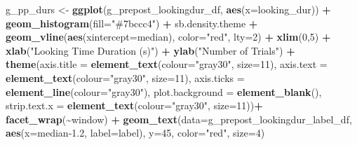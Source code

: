 \documentclass[
  doc,floatsintext]{apa6}
\newenvironment{Shaded}{\begin{snugshade}}{\end{snugshade}}
\newcommand{\AttributeTok}[1]{\textcolor[rgb]{0.13,0.29,0.53}{#1}}
\newcommand{\DecValTok}[1]{\textcolor[rgb]{0.00,0.00,0.81}{#1}}
\newcommand{\FloatTok}[1]{\textcolor[rgb]{0.00,0.00,0.81}{#1}}
\newcommand{\FunctionTok}[1]{\textcolor[rgb]{0.13,0.29,0.53}{\textbf{#1}}}
\newcommand{\NormalTok}[1]{#1}
\newcommand{\OtherTok}[1]{\textcolor[rgb]{0.56,0.35,0.01}{#1}}
\newcommand{\SpecialCharTok}[1]{\textcolor[rgb]{0.81,0.36,0.00}{\textbf{#1}}}
\newcommand{\StringTok}[1]{\textcolor[rgb]{0.31,0.60,0.02}{#1}}
\begin{document}
\begin{Shaded}
\begin{Highlighting}[]
\NormalTok{g\_pp\_durs }\OtherTok{\textless{}{-}} \FunctionTok{ggplot}\NormalTok{(g\_prepost\_lookingdur\_df, }\FunctionTok{aes}\NormalTok{(}\AttributeTok{x=}\NormalTok{looking\_dur)) }\SpecialCharTok{+}
  \FunctionTok{geom\_histogram}\NormalTok{(}\AttributeTok{fill=}\StringTok{"\#7bccc4"}\NormalTok{) }\SpecialCharTok{+}
\NormalTok{  sb.density.theme }\SpecialCharTok{+}
  \FunctionTok{geom\_vline}\NormalTok{(}\FunctionTok{aes}\NormalTok{(}\AttributeTok{xintercept=}\NormalTok{median), }\AttributeTok{color=}\StringTok{"red"}\NormalTok{, }\AttributeTok{lty=}\DecValTok{2}\NormalTok{) }\SpecialCharTok{+}
  \FunctionTok{xlim}\NormalTok{(}\DecValTok{0}\NormalTok{,}\DecValTok{5}\NormalTok{) }\SpecialCharTok{+}
  \FunctionTok{xlab}\NormalTok{(}\StringTok{"Looking Time Duration (s)"}\NormalTok{) }\SpecialCharTok{+}
  \FunctionTok{ylab}\NormalTok{(}\StringTok{"Number of Trials"}\NormalTok{) }\SpecialCharTok{+} 
  \FunctionTok{theme}\NormalTok{(}\AttributeTok{axis.title =} \FunctionTok{element\_text}\NormalTok{(}\AttributeTok{colour=}\StringTok{"gray30"}\NormalTok{, }\AttributeTok{size=}\DecValTok{11}\NormalTok{),}
        \AttributeTok{axis.text =} \FunctionTok{element\_text}\NormalTok{(}\AttributeTok{colour=}\StringTok{"gray30"}\NormalTok{, }\AttributeTok{size=}\DecValTok{11}\NormalTok{),}
        \AttributeTok{axis.ticks =} \FunctionTok{element\_line}\NormalTok{(}\AttributeTok{colour=}\StringTok{"gray30"}\NormalTok{),}
        \AttributeTok{plot.background =} \FunctionTok{element\_blank}\NormalTok{(),}
        \AttributeTok{strip.text.x =} \FunctionTok{element\_text}\NormalTok{(}\AttributeTok{colour=}\StringTok{"gray30"}\NormalTok{, }\AttributeTok{size=}\DecValTok{11}\NormalTok{))}\SpecialCharTok{+}
  \FunctionTok{facet\_wrap}\NormalTok{(}\SpecialCharTok{\textasciitilde{}}\NormalTok{window) }\SpecialCharTok{+}
  \FunctionTok{geom\_text}\NormalTok{(}\AttributeTok{data=}\NormalTok{g\_prepost\_lookingdur\_label\_df,}
            \FunctionTok{aes}\NormalTok{(}\AttributeTok{x=}\NormalTok{median}\FloatTok{{-}1.2}\NormalTok{, }\AttributeTok{label=}\NormalTok{label), }\AttributeTok{y=}\DecValTok{45}\NormalTok{, }
            \AttributeTok{color=}\StringTok{"red"}\NormalTok{, }\AttributeTok{size=}\DecValTok{4}\NormalTok{)}


\end{Highlighting}
\end{Shaded}
\end{document}
